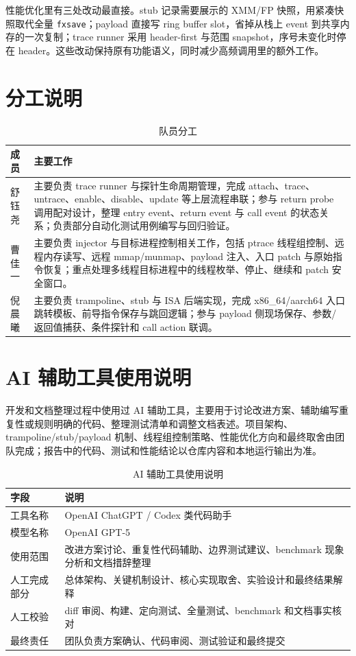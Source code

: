 \documentclass[UTF8,a4paper,11pt,fontset=fandol]{ctexart}
\newcommand{\code}[1]{\texttt{#1}}
\begin{document}
性能优化里有三处改动最直接。stub 记录需要展示的 XMM/FP 快照，用紧凑快照取代全量 \code{fxsave}；payload 直接写 ring buffer slot，省掉从栈上 event 到共享内存的一次复制；trace runner 采用 header-first 与范围 snapshot，序号未变化时停在 header。这些改动保持原有功能语义，同时减少高频调用里的额外工作。

\section{分工说明}

\begin{table}[H]
\centering
\caption{队员分工}
\begin{tabularx}{\textwidth}{P{2.4cm}Y}
\toprule
\textbf{成员} & \textbf{主要工作}\\
\midrule
舒钰尧 & 主要负责 trace runner 与探针生命周期管理，完成 attach、trace、untrace、enable、disable、update 等上层流程串联；参与 return probe 调用配对设计，整理 entry event、return event 与 call event 的状态关系；负责部分自动化测试用例编写与回归验证。\\
曹佳一 & 主要负责 injector 与目标进程控制相关工作，包括 ptrace 线程组控制、远程内存读写、远程 mmap/munmap、payload 注入、入口 patch 与原始指令恢复；重点处理多线程目标进程中的线程枚举、停止、继续和 patch 安全窗口。\\
倪晨曦 & 主要负责 trampoline、stub 与 ISA 后端实现，完成 x86\_64/aarch64 入口跳转模板、前导指令保存与跳回逻辑；参与 payload 侧现场保存、参数/返回值捕获、条件探针和 call action 联调。\\
\bottomrule
\end{tabularx}
\end{table}

\section{AI 辅助工具使用说明}

开发和文档整理过程中使用过 AI 辅助工具，主要用于讨论改进方案、辅助编写重复性或规则明确的代码、整理测试清单和调整文档表述。项目架构、trampoline/stub/payload 机制、线程组控制策略、性能优化方向和最终取舍由团队完成；报告中的代码、测试和性能结论以仓库内容和本地运行输出为准。

\begin{table}[H]
\centering
\caption{AI 辅助工具使用说明}
\label{tab:ai-usage}
\begin{tabularx}{\textwidth}{P{3.0cm}Y}
\toprule
\textbf{字段} & \textbf{说明}\\
\midrule
工具名称 & OpenAI ChatGPT / Codex 类代码助手\\
模型名称 & OpenAI GPT-5\\
使用范围 & 改进方案讨论、重复性代码辅助、边界测试建议、benchmark 现象分析和文档措辞整理\\
人工完成部分 & 总体架构、关键机制设计、核心实现取舍、实验设计和最终结果解释\\
人工校验 & diff 审阅、构建、定向测试、全量测试、benchmark 和文档事实核对\\
最终责任 & 团队负责方案确认、代码审阅、测试验证和最终提交\\
\bottomrule
\end{tabularx}
\end{table}
\end{document}
